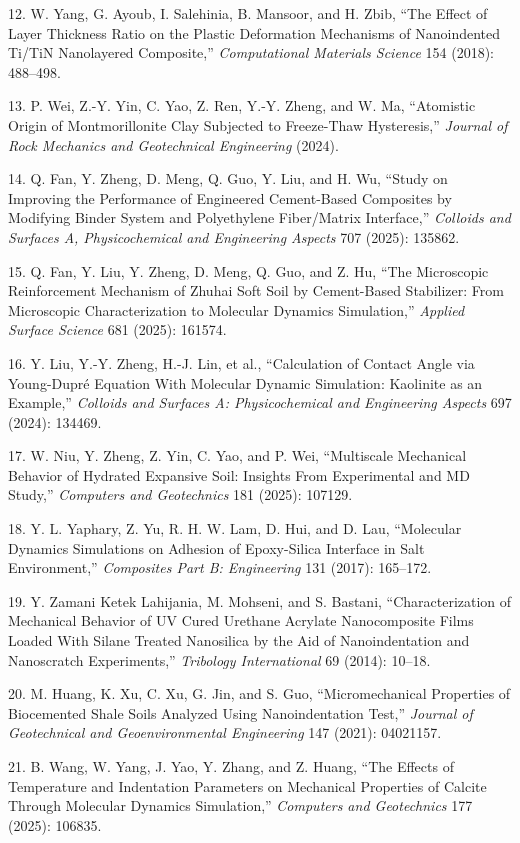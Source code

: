 \documentclass{article}
\begin{document}
\begin{hangpars}
12. W. Yang, G. Ayoub, I. Salehinia, B. Mansoor, and H. Zbib, “The Effect of Layer Thickness Ratio on the Plastic Deformation Mechanisms of Nanoindented Ti/TiN Nanolayered Composite,” \emph{Computational Materials Science} 154 (2018): 488–498.

13. P. Wei, Z.-Y. Yin, C. Yao, Z. Ren, Y.-Y. Zheng, and W. Ma, “Atomistic Origin of Montmorillonite Clay Subjected to Freeze-Thaw Hysteresis,” \emph{Journal of Rock Mechanics and Geotechnical Engineering} (2024).

14. Q. Fan, Y. Zheng, D. Meng, Q. Guo, Y. Liu, and H. Wu, “Study on Improving the Performance of Engineered Cement-Based Composites by Modifying Binder System and Polyethylene Fiber/Matrix Interface,” \emph{Colloids and Surfaces A, Physicochemical and Engineering Aspects} 707 (2025): 135862.

15. Q. Fan, Y. Liu, Y. Zheng, D. Meng, Q. Guo, and Z. Hu, “The Microscopic Reinforcement Mechanism of Zhuhai Soft Soil by Cement-Based Stabilizer: From Microscopic Characterization to Molecular Dynamics Simulation,” \emph{Applied Surface Science} 681 (2025): 161574.

16. Y. Liu, Y.-Y. Zheng, H.-J. Lin, et al., “Calculation of Contact Angle via Young-Dupré Equation With Molecular Dynamic Simulation: Kaolinite as an Example,” \emph{Colloids and Surfaces A: Physicochemical and Engineering Aspects} 697 (2024): 134469.

17. W. Niu, Y. Zheng, Z. Yin, C. Yao, and P. Wei, “Multiscale Mechanical Behavior of Hydrated Expansive Soil: Insights From Experimental and MD Study,” \emph{Computers and Geotechnics} 181 (2025): 107129.

18. Y. L. Yaphary, Z. Yu, R. H. W. Lam, D. Hui, and D. Lau, “Molecular Dynamics Simulations on Adhesion of Epoxy-Silica Interface in Salt Environment,” \emph{Composites Part B: Engineering} 131 (2017): 165–172.

19. Y. Zamani Ketek Lahijania, M. Mohseni, and S. Bastani, “Characterization of Mechanical Behavior of UV Cured Urethane Acrylate Nanocomposite Films Loaded With Silane Treated Nanosilica by the Aid of Nanoindentation and Nanoscratch Experiments,” \emph{Tribology International} 69 (2014): 10–18.

20. M. Huang, K. Xu, C. Xu, G. Jin, and S. Guo, “Micromechanical Properties of Biocemented Shale Soils Analyzed Using Nanoindentation Test,” \emph{Journal of Geotechnical and Geoenvironmental Engineering} 147 (2021): 04021157.

21. B. Wang, W. Yang, J. Yao, Y. Zhang, and Z. Huang, “The Effects of Temperature and Indentation Parameters on Mechanical Properties of Calcite Through Molecular Dynamics Simulation,” \emph{Computers and Geotechnics} 177 (2025): 106835.


\end{hangpars}
\end{document}
